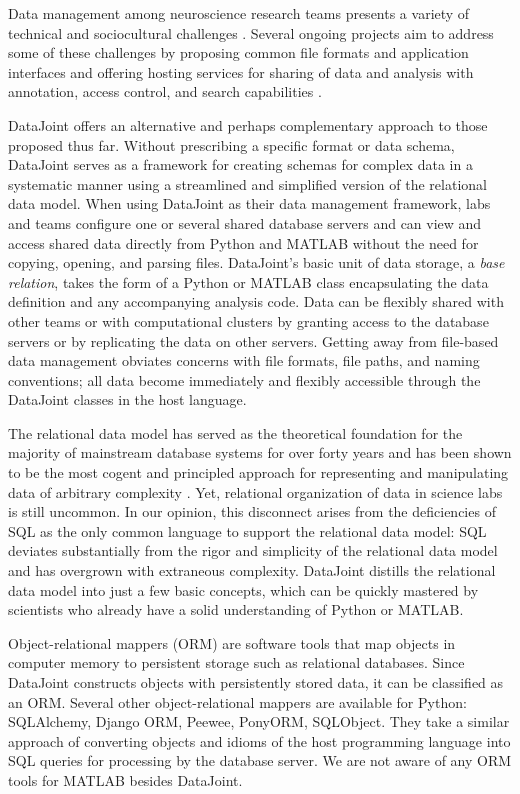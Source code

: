 Data management among neuroscience research teams presents a variety of technical and sociocultural challenges \cite{smith_sharing_2015}.
Several ongoing projects aim to address some of these challenges by proposing common file formats and application interfaces \cite{neuroshare, teeters_neurodata_2015} and offering hosting services for sharing of data and analysis with annotation, access control, and search capabilities \cite{smith_sharing_2015, herz_2008, crcns, carmen}.

DataJoint offers an alternative and perhaps complementary approach to those proposed thus far.
Without prescribing a specific format or data schema, DataJoint serves as a framework for creating schemas for complex data in a systematic manner using a streamlined and simplified version of the relational data model. 
When using DataJoint as their data management framework, labs and teams configure one or several shared database servers and can view and access shared data directly from Python and MATLAB without the need for copying, opening, and parsing files.
DataJoint's basic unit of data storage, a \emph{base relation}, takes the form of a Python or MATLAB class encapsulating the data definition and any accompanying analysis code. 
Data can be flexibly shared with other teams or with computational clusters by granting access to the database servers or by replicating the data on other servers. 
Getting away from file-based data management obviates concerns with file formats, file paths, and naming conventions; all data become immediately and flexibly accessible through the DataJoint classes in the host language.

The relational data model has served as the theoretical foundation for the majority of mainstream  database systems for over forty years and has been shown to be the most cogent and principled approach for representing and manipulating data of arbitrary complexity \cite{date_sql_2011}.
Yet, relational organization of data in science labs is still uncommon. 
In our opinion, this disconnect arises from the deficiencies of SQL as the only common language to support the relational data model: 
SQL deviates substantially from the rigor and simplicity of the relational data model and has overgrown with extraneous complexity.
DataJoint distills the relational data model into just a few basic concepts, which can be quickly mastered by scientists who already have a solid understanding of Python or MATLAB.

Object-relational mappers (ORM) are software tools that map objects in computer memory to persistent storage such as relational databases.
Since DataJoint constructs objects with persistently stored data, it can be classified as an ORM.
Several other object-relational mappers are available for Python: SQLAlchemy, Django ORM, Peewee, PonyORM, SQLObject.
They take a similar approach of converting objects and idioms of the host programming language into SQL queries for processing by the database server.
We are not aware of any ORM tools for MATLAB besides DataJoint.

